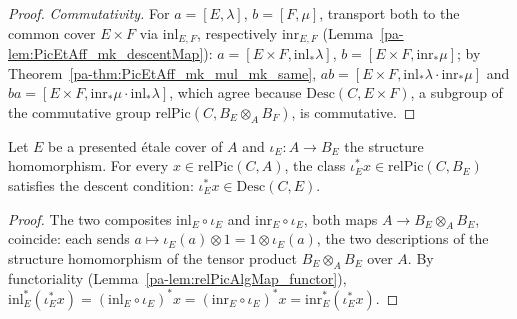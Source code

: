 \begin{proof}
  \emph{Commutativity.} For \(a = [E,\lambda]\), \(b = [F,\mu]\), transport both to the common
  cover \(E \times F\) via \(\mathrm{inl}_{E,F}\), respectively \(\mathrm{inr}_{E,F}\)
  (Lemma~\ref{pa-lem:PicEtAff_mk_descentMap}): \(a = [E \times F, \mathrm{inl}_{*}\lambda]\), \(b =
  [E \times F, \mathrm{inr}_{*}\mu]\); by Theorem~\ref{pa-thm:PicEtAff_mk_mul_mk_same}, \(ab = [E
  \times F, \mathrm{inl}_{*}\lambda \cdot \mathrm{inr}_{*}\mu]\) and \(ba = [E \times F,
  \mathrm{inr}_{*}\mu \cdot \mathrm{inl}_{*}\lambda]\), which agree because \(\mathrm{Desc}(C,E
  \times F)\), a subgroup of the commutative group \(\mathrm{relPic}(C, B_E \otimes_A B_F)\),
  is commutative.
\end{proof}

\begin{lemma}
  \label{pa-lem:PicEtAff_tautological_mem_descentClasses}
  \leanok

  Let \(E\) be a presented \'etale cover of \(A\) and \(\iota_E \colon A \to B_E\) the
  structure homomorphism. For every \(x \in \mathrm{relPic}(C,A)\), the class
  \(\iota_E^{*}x \in \mathrm{relPic}(C,B_E)\) satisfies the descent condition:
  \(\iota_E^{*}x \in \mathrm{Desc}(C,E)\).
\end{lemma}
\begin{proof}
  \leanok
  The two composites \(\mathrm{inl}_E \circ \iota_E\) and \(\mathrm{inr}_E \circ \iota_E\), both
  maps \(A \to B_E \otimes_A B_E\), coincide: each sends \(a \mapsto \iota_E(a) \otimes 1 = 1
  \otimes \iota_E(a)\), the two descriptions of the structure homomorphism of the tensor
  product \(B_E \otimes_A B_E\) over \(A\). By functoriality (Lemma~\ref{pa-lem:relPicAlgMap_functor}),
  \(\mathrm{inl}_E^{*}(\iota_E^{*}x) = (\mathrm{inl}_E \circ \iota_E)^{*}x = (\mathrm{inr}_E
  \circ \iota_E)^{*}x = \mathrm{inr}_E^{*}(\iota_E^{*}x)\).
\end{proof}

